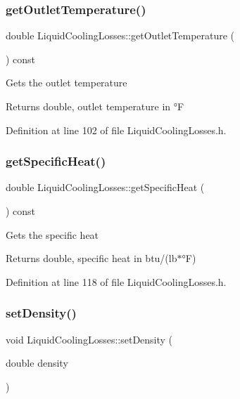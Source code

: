 \subsubsection{\texorpdfstring{get\+Outlet\+Temperature()}{getOutletTemperature()}}
{\footnotesize\ttfamily double Liquid\+Cooling\+Losses\+::get\+Outlet\+Temperature (\begin{DoxyParamCaption}{ }\end{DoxyParamCaption}) const\hspace{0.3cm}{\ttfamily [inline]}}

Gets the outlet temperature \begin{DoxyReturn}{Returns}
double, outlet temperature in °F 
\end{DoxyReturn}


Definition at line 102 of file Liquid\+Cooling\+Losses.\+h.

\mbox{\label{class_liquid_cooling_losses_aa60623b6f1fab605d25c9c24e8dd00ec}} 
\subsubsection{\texorpdfstring{get\+Specific\+Heat()}{getSpecificHeat()}}
{\footnotesize\ttfamily double Liquid\+Cooling\+Losses\+::get\+Specific\+Heat (\begin{DoxyParamCaption}{ }\end{DoxyParamCaption}) const\hspace{0.3cm}{\ttfamily [inline]}}

Gets the specific heat \begin{DoxyReturn}{Returns}
double, specific heat in btu/(lb$\ast$°F) 
\end{DoxyReturn}


Definition at line 118 of file Liquid\+Cooling\+Losses.\+h.

\mbox{\label{class_liquid_cooling_losses_a1fcb1780b588e0a6e5ca052ce2b360dc}} 
\subsubsection{\texorpdfstring{set\+Density()}{setDensity()}}
{\footnotesize\ttfamily void Liquid\+Cooling\+Losses\+::set\+Density (\begin{DoxyParamCaption}\item[{double}]{density }\end{DoxyParamCaption})\hspace{0.3cm}{\ttfamily [inline]}}

